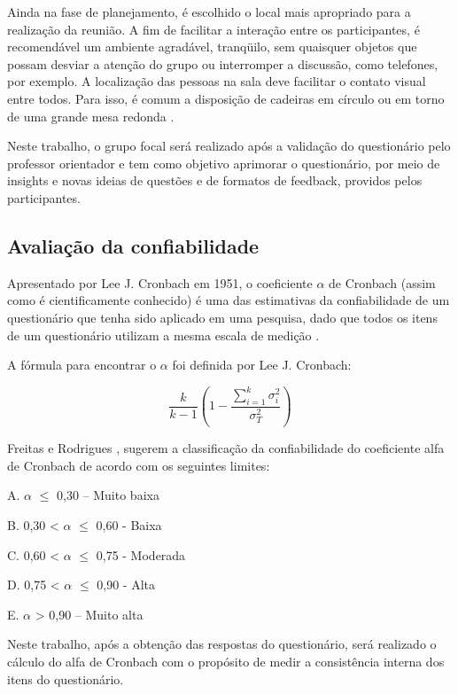 Ainda na fase de planejamento, é escolhido o local mais apropriado para a
realização da reunião. A fim de facilitar a interação entre os participantes, é recomendável
um ambiente agradável, tranqüilo, sem quaisquer objetos que possam desviar a atenção do
grupo ou interromper a discussão, como telefones, por exemplo. A localização das pessoas
na sala deve facilitar o contato visual entre todos. Para isso, é comum a disposição de
cadeiras em círculo ou em torno de uma grande mesa redonda \cite{dias2000grupo}.

Neste trabalho, o grupo focal será realizado após a validação do questionário pelo professor orientador e tem como objetivo aprimorar o questionário, por meio de insights e novas ideias de questões e de formatos de feedback, providos pelos participantes.

\subsection{Avaliação da confiabilidade}

Apresentado por Lee J. Cronbach em 1951, o coeficiente $\alpha$ de Cronbach (assim como é cientificamente conhecido) é uma das estimativas da confiabilidade de um questionário que tenha sido aplicado em uma pesquisa, dado que todos os itens de um questionário utilizam a mesma escala de medição \cite{freitas2005avaliaccao}.

A fórmula para encontrar o $\alpha$ foi definida por Lee J. Cronbach:

\begin{equation}
\frac{k}{k-1} \left(1 - \frac{\sum_{i=1}^{k} \sigma_{i}^2}{\sigma_{T}^2}\right)
\end{equation}

Freitas e Rodrigues \cite{freitas2005avaliaccao}, sugerem a classificação da confiabilidade do coeficiente alfa de Cronbach de acordo com os seguintes limites:

A. $\alpha$ $\leq$ 0,30 – Muito baixa

B. 0,30 < $\alpha$ $\leq$ 0,60 - Baixa

C. 0,60 < $\alpha$ $\leq$ 0,75 - Moderada

D. 0,75 < $\alpha$ $\leq$ 0,90 - Alta

E. $\alpha$ > 0,90 – Muito alta

Neste trabalho, após a obtenção das respostas do questionário, será realizado o cálculo do alfa de Cronbach com o propósito de medir a consistência interna dos itens do questionário.

